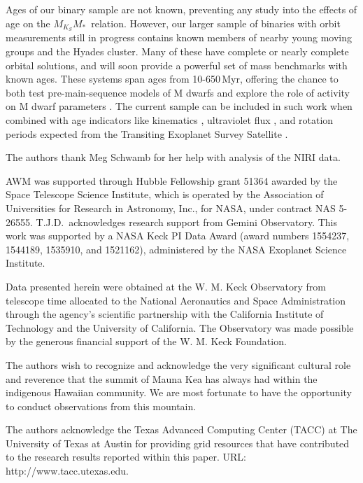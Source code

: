 \documentclass[twocolumn]{aastex62}
\newcommand{\mmk}{$M_{K_S}$\textendash$M_*$}
\begin{document}
Ages of our binary sample are not known, preventing any study into the effects of age on the \mmk\ relation. However, our larger sample of binaries with orbit measurements still in progress contains known members of nearby young moving groups and the Hyades cluster. Many of these have complete or nearly complete orbital solutions, and will soon provide a powerful set of mass benchmarks with known ages. These systems span ages from 10-650\,Myr, offering the chance to both test pre-main-sequence models of M dwarfs \citep{2015ApJ...813L..11M,2016ApJ...817..164R,2016ApJ...818..156C,2016AJ....152..175N} and explore the role of activity on M dwarf parameters \citep[e.g.,][]{Spada2013,Kesseli:2018aa}. The current sample can be included in such work when combined with age indicators like kinematics \citep{2018MNRAS.tmp..966W}, ultraviolet flux \citep{Ansdell2015}, and rotation periods expected from the Transiting Exoplanet Survey Satellite \citep[{\it TESS},][]{2014SPIE.9143E..20R}. 


\acknowledgements
The authors thank Meg Schwamb for her help with analysis of the NIRI data. 

AWM was supported through Hubble Fellowship grant 51364 awarded by the Space Telescope Science Institute, which is operated by the Association of Universities for Research in Astronomy, Inc., for NASA, under contract NAS 5-26555. T.J.D.\ acknowledges research support from Gemini Observatory. This work was supported by a NASA Keck PI Data Award (award numbers 1554237, 1544189, 1535910, and 1521162), administered by the NASA Exoplanet Science Institute. 

Data presented herein were obtained at the W. M. Keck Observatory from telescope time allocated to the National Aeronautics and Space Administration through the agency's scientific partnership with the California Institute of Technology and the University of California. The Observatory was made possible by the generous financial support of the W. M. Keck Foundation.

The authors wish to recognize and acknowledge the very significant cultural role and reverence that the summit of Mauna Kea has always had within the indigenous Hawaiian community. We are most fortunate to have the opportunity to conduct observations from this mountain.

The authors acknowledge the Texas Advanced Computing Center (TACC) at The University of Texas at Austin for providing grid resources that have contributed to the research results reported within this paper. URL: http://www.tacc.utexas.edu.
\end{document}
